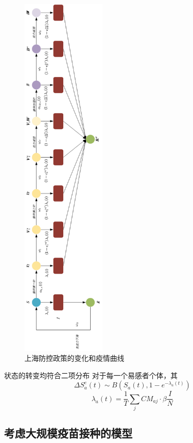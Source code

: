 \documentclass[bwprint]{gmcmthesis}
\numberwithin{figure}{section}
\begin{document}
\begin{figure}[!h]
\centering
\includegraphics[width=0.36\textwidth]{vaccine.png}
\caption{上海防控政策的变化和疫情曲线}
\label{fig3}
\end{figure}

\par 状态的转变均符合二项分布
对于每一个易感者个体，其
\begin{equation}
\Delta S^e_a(t)\sim B(S_a(t),1-e^{-\lambda_a(t)})
\end{equation}
\begin{equation}
\lambda_a(t)=\frac{1}{T}\sum_jCM_{aj}\cdot\beta\frac{I}{N}
\end{equation}
\subsection{考虑大规模疫苗接种的模型}
\end{document}
